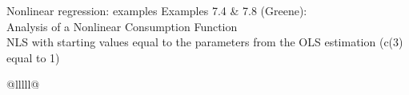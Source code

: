 \documentclass{beamer}
\begin{document}
\begin{frame}{Nonlinear regression: examples}
Examples 7.4 \& 7.8 (Greene): \\Analysis of a Nonlinear Consumption Function\\
NLS with starting values equal to the parameters from the OLS estimation (c(3) equal to 1)\\ \medskip
\tiny
\begin{table}[]
\centering
\begin{tabular}{@{}lllll@{}}
\toprule
{} \\
                                                                                                                                                                                                                                                                                                                       \\
                                                                                                                                                                                                                                                                                                                       \\
                                                                                                                                                                                                                                                                                                                       \\
                                                                                                                                                                                                                                                                                                                       \\

\end{tabular}
\end{table}
\end{frame}
\end{document}
